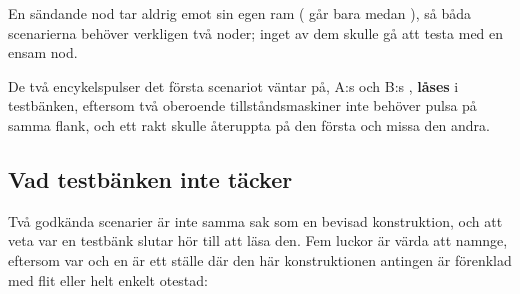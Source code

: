 En sändande nod tar aldrig emot sin egen ram ( går bara medan ),
så båda scenarierna behöver verkligen två noder; inget av dem skulle gå att testa med en ensam nod.

De två encykelspulser det första scenariot väntar på, A:s  och B:s ,
\textbf{låses} i testbänken, eftersom två oberoende tillståndsmaskiner inte behöver pulsa på samma
flank, och ett rakt  skulle återuppta på den första och missa
den andra.

\subsection*{Vad testbänken inte täcker}
\label{c19:sub:gaps-tb}

Två godkända scenarier är inte samma sak som en bevisad konstruktion, och att veta var en testbänk
slutar hör till att läsa den. Fem luckor är värda att namnge, eftersom var och en är ett ställe där
den här konstruktionen antingen är förenklad med flit eller helt enkelt otestad:
